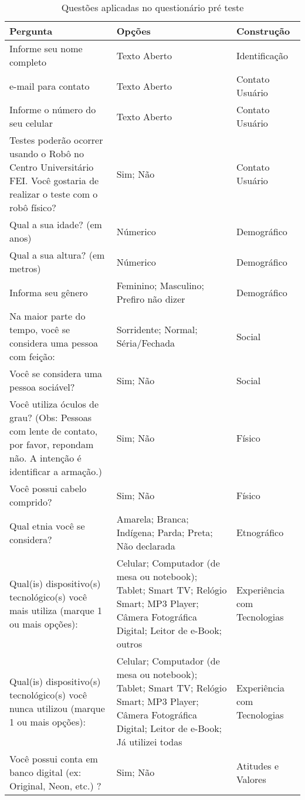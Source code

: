 \begin{longtable}{ m{7 cm} | m{5cm} | m{4cm} }
	\caption{Questões aplicadas no questionário pré teste }
	\label{tab:questoespreteste} \\	\hline
	Pergunta & Opções & Construção \\ \hline
	Informe seu nome completo & Texto Aberto & Identificação \\ \hline
	e-mail para contato & Texto Aberto & Contato Usuário \\ \hline
	Informe o número do seu celular & Texto Aberto & Contato Usuário \\ \hline
	Testes poderão ocorrer usando o Robô no Centro Universitário FEI. Você gostaria de realizar o teste com o robô físico? & Sim; Não & Contato Usuário \\ \hline
	Qual a sua idade? (em anos) & Númerico & Demográfico \\ \hline
	Qual a sua altura? (em metros) & Númerico & Demográfico \\ \hline
	Informa seu gênero & Feminino; Masculino; Prefiro não dizer & Demográfico \\ \hline
	Na maior parte do tempo, você se considera uma pessoa com feição: & Sorridente; Normal; Séria/Fechada & Social \\ \hline
	Você se considera uma pessoa sociável? & Sim; Não & Social \\ \hline
	Você utiliza óculos de grau? (Obs: Pessoas com lente de contato, por favor, repondam não. A intenção é identificar a armação.) & Sim; Não & Físico \\ \hline
	Você possui cabelo comprido? & Sim; Não & Físico \\ \hline
	Qual etnia você se considera? & Amarela; Branca; Indígena; Parda; Preta; Não declarada & Etnográfico \\ \hline
	Qual(is) dispositivo(s) tecnológico(s) você mais utiliza (marque 1 ou mais opções): & Celular; Computador (de mesa ou notebook); Tablet; Smart TV; Relógio Smart; MP3 Player; Câmera Fotográfica Digital; Leitor de e-Book; outros & Experiência com Tecnologias \\ \hline
	Qual(is) dispositivo(s) tecnológico(s) você nunca utilizou (marque 1 ou mais opções): & Celular; Computador (de mesa ou notebook); Tablet; Smart TV; Relógio Smart; MP3 Player; Câmera Fotográfica Digital; Leitor de e-Book; Já utilizei todas & Experiência com Tecnologias \\ \hline
	Você possui conta em banco digital (ex: Original, Neon, etc.) ? & Sim; Não & Atitudes e Valores \\ \hline

\end{longtable}
